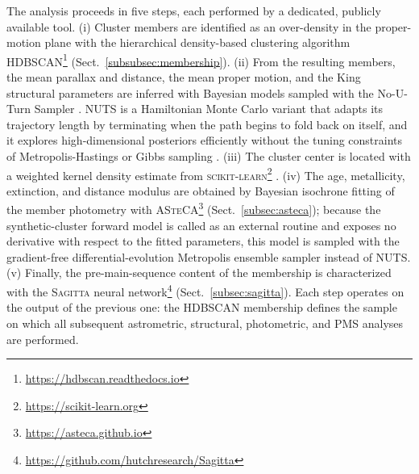 \documentclass{aa}
\begin{document}
The analysis proceeds in five steps, each performed by a dedicated, publicly available tool. (i) Cluster members are identified as an over-density in the proper-motion plane with the hierarchical density-based clustering algorithm \textsc{HDBSCAN}\footnote{\url{https://hdbscan.readthedocs.io}} \citep{10.1007/978-3-642-37456-2_14,McInnes2017} (Sect.~\ref{subsubsec:membership}). (ii) From the resulting members, the mean parallax and distance, the mean proper motion, and the King structural parameters are inferred with Bayesian models sampled with the No-U-Turn Sampler \citep[NUTS;][]{2014JMLR...15.1593H}. NUTS is a Hamiltonian Monte Carlo variant that adapts its trajectory length by terminating when the path begins to fold back on itself, and it explores high-dimensional posteriors efficiently without the tuning constraints of Metropolis-Hastings or Gibbs sampling \citep{pymc2023}. (iii) The cluster center is located with a weighted kernel density estimate from \textsc{scikit-learn}\footnote{\url{https://scikit-learn.org}} \citep{scikit-learn}. (iv) The age, metallicity, extinction, and distance modulus are obtained by Bayesian isochrone fitting of the member photometry with \textsc{ASteCA}\footnote{\url{https://asteca.github.io}} \citep{2015A&A...576A...6P} (Sect.~\ref{subsec:asteca}); because the synthetic-cluster forward model is called as an external routine and exposes no derivative with respect to the fitted parameters, this model is sampled with the gradient-free differential-evolution Metropolis ensemble sampler \citep[DEMetropolis;][]{2006S&C....16..239T} instead of NUTS\@. (v) Finally, the pre-main-sequence content of the membership is characterized with the \textsc{Sagitta} neural network\footnote{\url{https://github.com/hutchresearch/Sagitta}} \citep{2021AJ....162..282M} (Sect.~\ref{subsec:sagitta}). Each step operates on the output of the previous one: the \textsc{HDBSCAN} membership defines the sample on which all subsequent astrometric, structural, photometric, and PMS analyses are performed.  %
\end{document}
